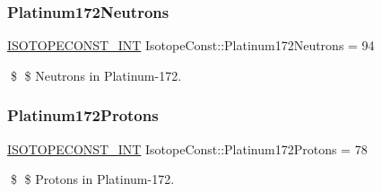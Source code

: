 \subsubsection{\texorpdfstring{Platinum172\+Neutrons}{Platinum172Neutrons}}
{\footnotesize\ttfamily \mbox{\hyperlink{group___isotope_const-_macros_ga5f18360b3e99483a35c32d789e62621c}{I\+S\+O\+T\+O\+P\+E\+C\+O\+N\+S\+T\+\_\+\+I\+NT}} Isotope\+Const\+::\+Platinum172\+Neutrons = 94}

\$ \$ Neutrons in Platinum-\/172. \mbox{\label{group___isotope_const-_platinum-_pt172_ga7bce0e0da6a9c1a83e3ac3d7ecc1aafc}} 
\subsubsection{\texorpdfstring{Platinum172\+Protons}{Platinum172Protons}}
{\footnotesize\ttfamily \mbox{\hyperlink{group___isotope_const-_macros_ga5f18360b3e99483a35c32d789e62621c}{I\+S\+O\+T\+O\+P\+E\+C\+O\+N\+S\+T\+\_\+\+I\+NT}} Isotope\+Const\+::\+Platinum172\+Protons = 78}

\$ \$ Protons in Platinum-\/172. 